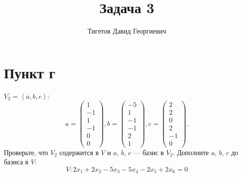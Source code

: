 \documentclass[12pt]{article}
\begin{document}
    \title{Задача 3}
    \author{Тигетов Давид Георгиевич}
    \date{}
    \maketitle

    \section*{Пункт г}
    $V_2 = \left < a, b, c \right >$:
    \[
        a =
        \begin{pmatrix}
            1 \\ -1 \\ 1 \\ -1 \\ 0 \\ 0
        \end{pmatrix},
        b =
        \begin{pmatrix}
            -5 \\ 1 \\ -1 \\ -1 \\ 2 \\ 1
        \end{pmatrix},
        c =
        \begin{pmatrix}
            2 \\ 2 \\ 0 \\ 2 \\ -1 \\ 0
        \end{pmatrix} .
    \]
    Проверьте, что $V_2$ содержится в $V$ и $a$, $b$, $c$ --- базис в $V_2$. Дополните $a$, $b$, $c$ до базиса в $V$:
    \[
        V: 2 x_1 + 2 x_2 - 5 x_3 - 5 x_4 - 2 x_5 + 2 x_6 = 0
    \]
\end{document}
